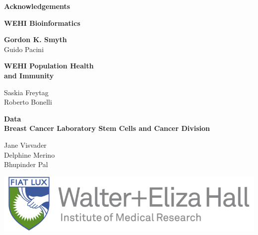 \documentclass[9pt,t]{beamer}
\begin{document}
\begin{frame}[plain,t]
	\vspace{0.7cm}
	\textbf{\huge{Acknowledgements}}\\
	\vspace{1cm}
	
	\begin{minipage}[t]{0.49\textwidth}
	{\color{oxygenpurple}\textbf{WEHI Bioinformatics}}\\
	\vspace{0.20cm}
	
	\textbf{Gordon K. Smyth}\\
	Guido Pacini\\
	\vspace{0.35cm}
	
	{\color{oxygenpurple}\textbf{WEHI Population Health \\and Immunity}}\\
	\vspace{0.20cm}
	
	Saskia Freytag\\
	Roberto Bonelli\\
	\vspace{0.7cm}
	\end{minipage}%
	\begin{minipage}[t]{0.49\textwidth}
	{\color{oxygenpurple}\textbf{Data}}\\	
	{\color{oxygenrose}\textbf{Breast Cancer Laboratory Stem Cells and Cancer Division}}\\
	\vspace{0.20cm}
	
	Jane Visvader\\
	Delphine Merino\\
	Bhupinder Pal
	\vspace{0.75cm}
	
	\includegraphics[width=1\textwidth]{WEHI}
	\vspace{1.35cm}
	
	
	\end{minipage}
\end{frame}

\end{document}
